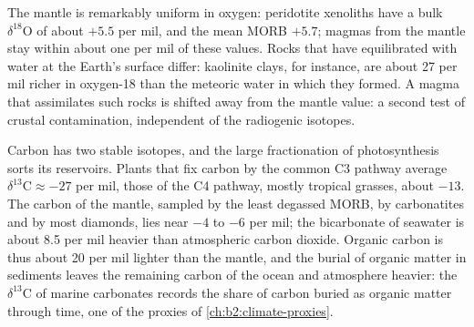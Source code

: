 The mantle is remarkably uniform in oxygen: peridotite xenoliths have a bulk
$\delta^{18}\mathrm{O}$ of about $+5.5$ per mil, and the mean MORB $+5.7$; magmas
from the mantle stay within about one per mil of these values. Rocks that have
equilibrated with water at the Earth's surface differ: kaolinite clays, for
instance, are about 27 per mil richer in oxygen-18 than the meteoric water in which
they formed. A magma that assimilates such rocks is shifted away from the mantle
value: a second test of crustal contamination, independent of the radiogenic
isotopes.

Carbon has two stable isotopes, and the large fractionation of photosynthesis
sorts its reservoirs. Plants that fix carbon by the common C3 pathway average
$\delta^{13}\mathrm{C} \approx -27$ per mil, those of the C4 pathway, mostly tropical
grasses, about $-13$. The carbon of the mantle, sampled by the least degassed
MORB, by carbonatites and by most diamonds, lies near $-4$ to $-6$ per mil; the
bicarbonate of seawater is about 8.5 per mil heavier than atmospheric carbon
dioxide. Organic carbon is thus about 20 per mil lighter than the mantle, and
the burial of organic matter in sediments leaves the remaining carbon of the
ocean and atmosphere heavier: the $\delta^{13}\mathrm{C}$ of marine carbonates
records the share of carbon buried as organic matter through time, one of the
proxies of \cref{ch:b2:climate-proxies}.

\begin{omfigure}
\centering
{}
\par{}
\end{omfigure}

